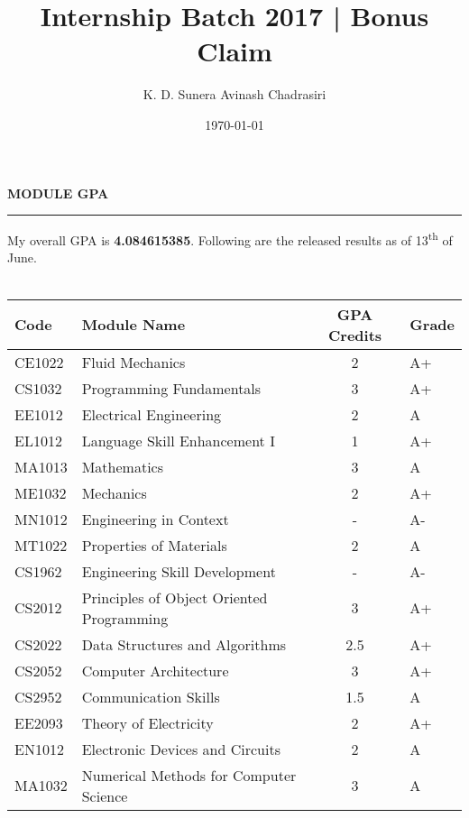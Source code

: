 \documentclass{article}
\title{Internship Batch 2017 | Bonus Claim}
\author{K. D. Sunera Avinash Chadrasiri}
\date{\today}
\newenvironment{rSection}[1]{
    \sectionskip
    \MakeUppercase{\bf #1} 
    \sectionlineskip
    \hrule
    \begin{list}{}{ 
        \setlength{\leftmargin}{1.5em} 
    }
    \item[]
}{
    \end{list}
}
\def\sectionskip{\medskip}
\def\sectionlineskip{\medskip}
\begin{document}
\maketitle
\newpage

\begin{rSection}{Module GPA}
My overall GPA is \textbf{4.084615385}. Following are the released results as of 13\textsuperscript{th} of June.\\ \\
\begin{tabularx}{\linewidth}{|l|X|c|l|}
    \hline
    \bf Code&   \bf Module Name                             & \bf GPA Credits & \bf Grade \\
    \hline
    \hline
    CE1022  &   Fluid Mechanics	                            & 2     &    A+ \\
    CS1032  &   Programming Fundamentals	                & 3     &    A+ \\
    EE1012  &   Electrical Engineering	                    & 2     &    A  \\
    EL1012  &   Language Skill Enhancement I	            & 1     &    A+ \\
    MA1013  &   Mathematics	                                & 3     &    A  \\
    ME1032  &   Mechanics	                                & 2     &    A+ \\
    MN1012  &   Engineering in Context	                    & -     &    A- \\
    MT1022  &   Properties of Materials	                    & 2     &    A  \\
    \hline
    CS1962  &   Engineering Skill Development	            & -     &    A- \\
    CS2012  &   Principles of Object Oriented Programming   & 3     &    A+ \\
    CS2022  &   Data Structures and Algorithms	            & 2.5   &    A+ \\
    CS2052  &   Computer Architecture	                    & 3     &    A+ \\
    CS2952  &   Communication Skills	                    & 1.5   &    A  \\
    EE2093  &   Theory of Electricity	                    & 2     &    A+ \\
    EN1012  &   Electronic Devices and Circuits	            & 2     &    A  \\
    MA1032  &   Numerical Methods for Computer Science	    & 3     &    A  \\

\end{tabularx}
\end{rSection}
\end{document}
